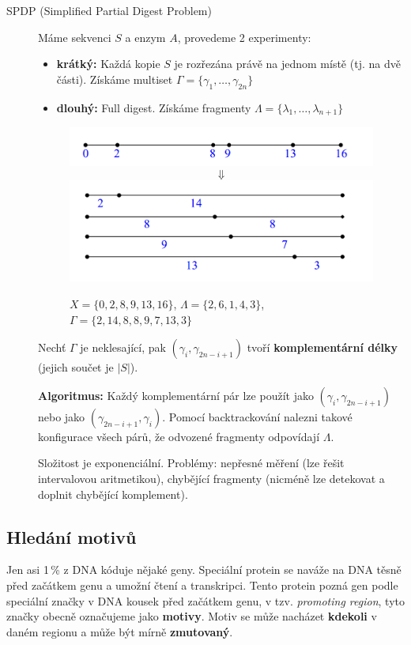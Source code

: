 \documentclass[11pt]{report} %
\numberwithin{equation}{section}
\begin{document}
\begin{description}
\begin{description}
	\end{description}
	
	\item[SPDP (Simplified Partial Digest Problem)] Máme sekvenci $S$ a enzym $A$, provedeme 2 experimenty:
	\begin{itemize}
		\item \textbf{krátký:} Každá kopie $S$ je rozřezána právě na jednom místě (tj. na dvě části). Získáme multiset $\Gamma = \{\gamma_1, \dots, \gamma_{2n} \}$
		\item \textbf{dlouhý:} Full digest. Získáme fragmenty $\Lambda = \{\lambda_1, \dots, \lambda_{n+1} \}$
	\end{itemize}
	
	\begin{figure}[H]
		\centering
		\includegraphics[scale=1]{img/spdp1.png}
		$$\Downarrow$$
		\includegraphics[scale=1]{img/spdp2.png}
		\caption{$X = \{0,2,8,9,13,16\}$, $\Lambda = \{2,6,1,4,3\}$, $\Gamma = \{2,14,8,8,9,7,13,3\}$}
	\end{figure}
	
	Nechť $\Gamma$ je neklesající, pak $(\gamma_i, \gamma_{2n-i+1})$ tvoří \textbf{komplementární délky} (jejich součet je $|S|$). 
	
	\textbf{Algoritmus:} Každý komplementární pár lze použít jako $(\gamma_i, \gamma_{2n-i+1})$ nebo jako $(\gamma_{2n-i+1}, \gamma_i)$. Pomocí backtrackování nalezni takové konfigurace všech párů, že odvozené fragmenty odpovídají $\Lambda$.
	
	Složitost je exponenciální. Problémy: nepřesné měření (lze řešit intervalovou aritmetikou), chybějící fragmenty (nicméně lze detekovat a doplnit chybějící komplement).
\end{description}

\subsection{Hledání motivů}
Jen asi 1\,\% z DNA kóduje nějaké geny. Speciální protein se naváže na DNA těsně před začátkem genu a umožní čtení a transkripci. Tento protein pozná gen podle speciální značky v DNA kousek před začátkem genu, v tzv. \textit{promoting region}, tyto značky obecně označujeme jako \textbf{motivy}. Motiv se může nacházet \textbf{kdekoli} v daném regionu a může být mírně \textbf{zmutovaný}.
\end{document}
